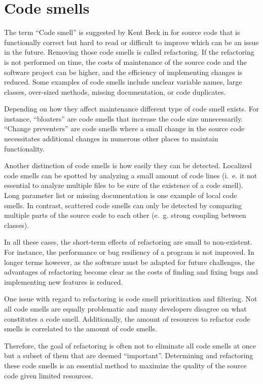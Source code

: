 \section{Code smells}\label{sec:code_smell}

The term \enquote{Code smell} is suggested by Kent Beck in \cite{fowler2019refactoring} for source code that is functionally correct but hard to read or difficult to improve which can be an issue in the future. Removing those code smells is called refactoring. If the refactoring is not performed on time, the costs of maintenance of the source code and the software project can be higher, and the efficiency of implementing changes is reduced. Some examples of code smells include unclear variable names, large classes, over-sized methods, missing documentation, or code duplicates. 

Depending on how they affect maintenance  different type of code smell exists. For instance, \enquote{bloaters} are code smells that increase the code size unnecessarily. \enquote{Change preventers} are code smells where a small change in the source code necessitates additional changes in numerous other places to maintain functionality. \cite{data_clumps_refactoring_guru}


Another distinction of code smells is how easily they can be detected. Localized code smells can be spotted by analyzing a small amount of code lines (i.~e. it not essential to analyze multiple files to be sure of the existence of a code smell). Long parameter list or missing documentation is one example of local code smells.  In contrast, scattered code smells can only be detected by comparing multiple parts of the source code to each other (e.~g. strong coupling between classes). \cite{code_smell_survival}

In all these cases, the short-term effects of refactoring are small to non-existent. For instance, the performance or bug resiliency of a program is not improved. In longer terms however, as the software must be adapted for future challenges, the advantages of refactoring become clear as the costs of finding and fixing bugs and implementing new features is reduced. 

One issue with regard to refactoring is code smell prioritization and filtering. Not all code smells are equally problematic and many developers disagree on what constitutes a code smell. Additionally,  the amount of resources to refactor code smells is correlated to the amount of code smells. \cite{10.1007/978-981-13-8300-7_21}

Therefore, the goal of refactoring is often not to eliminate all code smells at once but a subset of them that are deemed \enquote{important}. Determining and refactoring these code smells is an essential method to maximize the quality of the source code  given limited resources. \cite{code_smell_prio} 